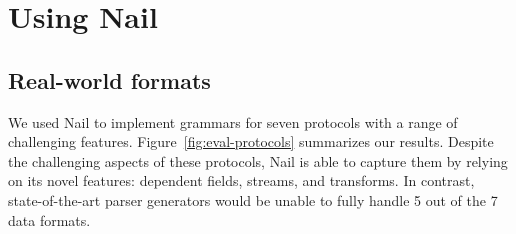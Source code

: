 \section{Using Nail}
\label{s:eval}








\subsection{Real-world formats}
\label{s:eval-formats}
 We used Nail to implement grammars
for seven protocols with a range of challenging features.
Figure~\ref{fig:eval-protocols} summarizes our results.
Despite the challenging aspects of these protocols, Nail is
able to capture them by relying on its novel features: dependent
fields, streams, and transforms.  In contrast, state-of-the-art parser
generators would be unable to fully handle 5 out of the 7 data formats.

